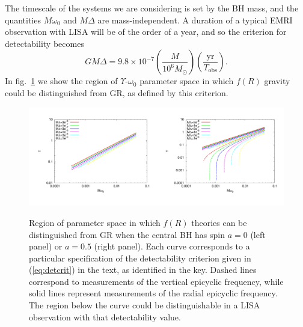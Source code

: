 \documentclass[aps,prd,amsfonts,amssymb,amsmath,nofootinbib,reprint,showpacs]{revtex4-1}
\newcommand{\eqnref}[1]{(\ref{eq:#1})}
\newcommand{\figref}[1]{fig.\ \ref{fig:#1}}
\newcommand{\sub}[1]{\ensuremath{_\text{#1}}}
\begin{document}
The timescale of the systems we are considering is set by the BH mass, and the quantities $M\omega_0$ and $M\Delta$ are mass-independent. A duration of a typical EMRI observation with LISA will be of the order of a year, and so the criterion for detectability becomes
\begin{equation}
GM\Delta = 9.8\times10^{-7} \left(\frac{M}{10^6 M_{\odot}}\right) \left(\frac{\mathrm{yr}}{T\sub{obs}}\right). \label{eq:detcrit}
\end{equation}
In \figref{epifig} we show the region of $\Upsilon$-$\omega_0$ parameter space in which $f(R)$ gravity could be distinguished from GR, as defined by this criterion.
\begin{figure}[htbp]
\centering
\centerline{\includegraphics[angle=270, width=0.5\textwidth]{EpicycleConstraintsa0}\quad\includegraphics[angle=270, width=0.5\textwidth]{EpicycleConstraintsa05}}
\caption{\label{fig:epifig}Region of parameter space in which $f(R)$ theories can be distinguished from GR when the central BH has spin $a=0$ (left panel) or $a=0.5$ (right panel). Each curve corresponds to a particular specification of the detectability criterion given in \eqnref{detcrit} in the text, as identified in the key. Dashed lines correspond to measurements of the vertical epicyclic frequency, while solid lines represent measurements of the radial epicyclic frequency. The region below the curve could be distinguishable in a LISA observation with that detectability value.}
\end{figure}
\end{document}

